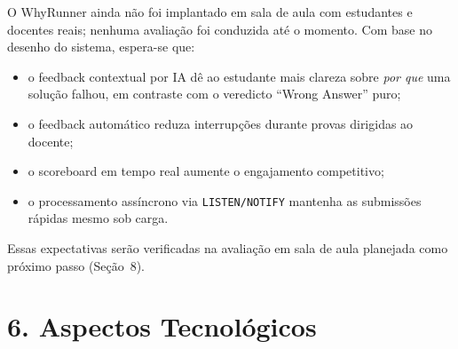 \documentclass[12pt]{article}
\begin{document}
O WhyRunner ainda não foi implantado em sala de aula com estudantes e
docentes reais; nenhuma avaliação foi conduzida até o momento. Com base no
desenho do sistema, espera-se que:
\begin{itemize}[nosep]
  \item o feedback contextual por IA dê ao estudante mais clareza sobre
        \emph{por que} uma solução falhou, em contraste com o veredicto
        ``Wrong Answer'' puro;
  \item o feedback automático reduza interrupções durante provas dirigidas ao
        docente;
  \item o scoreboard em tempo real aumente o engajamento competitivo;
  \item o processamento assíncrono via \texttt{LISTEN/NOTIFY} mantenha as
        submissões rápidas mesmo sob carga.
\end{itemize}
Essas expectativas serão verificadas na avaliação em sala de aula planejada
como próximo passo (Seção~8).

\section*{6. Aspectos Tecnológicos}
\end{document}
